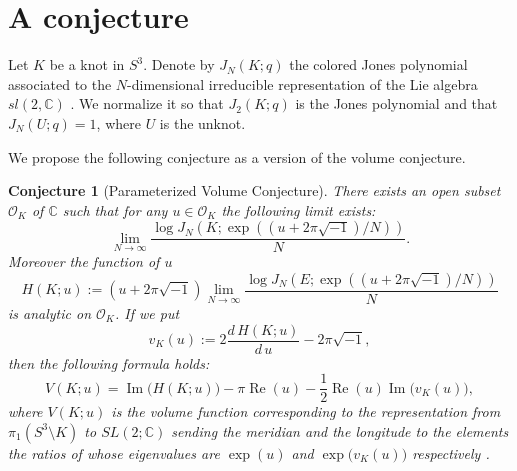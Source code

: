 \documentclass[a4paper]{amsart}
\theoremstyle{plain}
\newtheorem{conj}[thm]{Conjecture}
\theoremstyle{definition}
\theoremstyle{remark}
\newcommand{\C}{\mathbb{C}}
\renewcommand{\Re}{\operatorname{Re}}
\renewcommand{\Im}{\operatorname{Im}}
\numberwithin{equation}{section}
\begin{document}
\section{A conjecture}
Let $K$ be a knot in $S^3$.
Denote by $J_N(K;q)$ the colored Jones polynomial associated to the $N$-dimensional irreducible representation of the Lie algebra $sl(2,\C)$
\cite{Kirillov/Reshetikhin:1989}.
We normalize it so that $J_2(K;q)$ is the Jones polynomial \cite{Jones:BULAM385} and that $J_N(U;q)=1$, where $U$ is the unknot.
\par
We propose the following conjecture as a version of the volume conjecture.
\begin{conj}[Parameterized Volume Conjecture]\label{conj:parameterization}
There exists an open subset $\mathcal{O}_{K}$ of $\C$ such that for any
$u\in\mathcal{O}_{K}$ the following limit exists:
\begin{equation}\label{eq:limit}
  \lim_{N\to\infty}
  \frac{\log
        J_N\left(
             K;\exp\left(
                     \left(u+2\pi\sqrt{-1}\right)/N
                   \right)
           \right)}
       {N}.
\end{equation}
Moreover the function of $u$
\begin{equation}\label{eq:H}
  H(K;u)
  :=
  \left(u+2\pi\sqrt{-1}\right)
  \lim_{N\to\infty}
  \frac{\log
        J_N\left(
             E;\exp\left(
                     \left(u+2\pi\sqrt{-1}\right)/N
                   \right)
           \right)}
       {N}
\end{equation}
is analytic on $\mathcal{O}_{K}$.
If we put
\begin{equation*}
  v_{K}(u)
  :=
  2\frac{d\,H(K;u)}{d\,u}-2\pi\sqrt{-1},
\end{equation*}
then the following formula holds:
\begin{equation}\label{eq:volume}
  V(K;u)
  =
  \Im\bigl(H(K;u)\bigr)-\pi\Re(u)-\frac{1}{2}\Re(u)\Im\bigl(v_{K}(u)\bigr),
\end{equation}
where $V(K;u)$ is the volume function corresponding to the representation from $\pi_1(S^3\setminus{K})$ to $SL(2;\C)$ sending the meridian and the longitude to the elements the ratios of whose eigenvalues are $\exp(u)$ and $\exp\bigl(v_{K}(u)\bigr)$ respectively \cite[\S~4.5]{Cooper/Culler/Gillet/Long/Shalen:INVEM1994}.
\end{conj}
\end{document}
